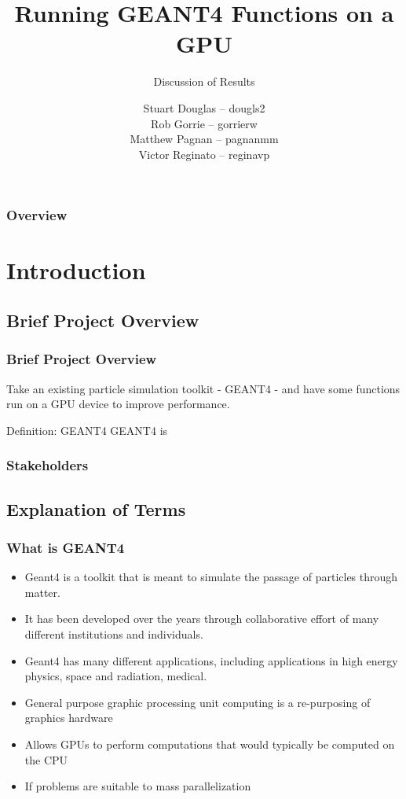 \documentclass{beamer}
\title[GEANT4-GPU (McMaster University)]{Running GEANT4 Functions on a GPU}
\subtitle{Discussion of Results}
\institute{McMaster University}
\author[S. Douglas, R. Gorrie, M .Pagnan, V. Reginato]{
Stuart Douglas -- dougls2
\\Rob Gorrie -- gorrierw
\\Matthew Pagnan -- pagnanmm
\\Victor Reginato -- reginavp
}
\begin{document}
\frame{\titlepage}
\begin{frame}
\frametitle{Overview}
\tableofcontents
\end{frame}

\section{Introduction} 

\subsection{Brief Project Overview}
\begin{frame}
\frametitle{Brief Project Overview}
Take an existing particle simulation toolkit - GEANT4 - and have some functions run on a GPU device to improve performance.
\begin{block}{Definition: GEANT4}
GEANT4 is 
\end{block}
\end{frame}

\begin{frame}
\frametitle{Stakeholders}
\end{frame}

\subsection{Explanation of Terms}
\begin{frame}
\frametitle{What is GEANT4}
\begin{itemize}
\item Geant4 is a toolkit that is meant to simulate the passage of particles through matter. 
\item It has been developed over the years through collaborative effort of many different institutions and individuals. 
\item Geant4 has many different applications, including applications in high energy physics, space and radiation, medical. 
\end{itemize}
\end{frame}

\begin{frame}
\begin{itemize}
\frametitle{What is GP-GPU}
\item General purpose graphic processing unit computing is a re-purposing of graphics hardware
\item Allows GPUs  to perform computations that would typically be computed on the CPU
\item If problems are suitable to mass parallelization 
\end{itemize}
\end{frame}
\end{document}
